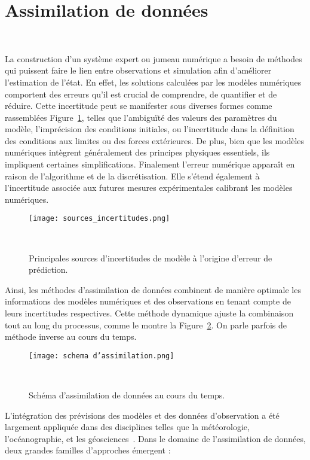 
\section{Assimilation de données}~\label{sec:da}

La construction d'un système expert ou jumeau numérique a besoin de méthodes qui puissent faire le lien entre observations et simulation afin d'améliorer l'estimation de l'état. En effet, les solutions calculées par les modèles numériques comportent des erreurs qu'il est crucial de comprendre, de quantifier et de réduire. Cette incertitude peut se manifester sous diverses formes comme rassemblées Figure~\ref{fig:sources_erreur}, telles que l'ambiguïté des valeurs des paramètres du modèle, l'imprécision des conditions initiales, ou l'incertitude dans la définition des conditions aux limites ou des forces extérieures. De plus, bien que les modèles numériques intègrent généralement des principes physiques essentiels, ils impliquent certaines simplifications. Finalement l'erreur numérique apparaît en raison de l'algorithme et de la discrétisation. Elle s'étend également à l'incertitude associée aux futures mesures expérimentales calibrant les modèles numériques.

\begin{figure}[h]
    \centering
    \texttt{[image: sources\_incertitudes.png]}
    \caption{Principales sources d'incertitudes de modèle à l'origine d'erreur de prédiction.}~\label{fig:sources_erreur}
\end{figure}
Ainsi, les méthodes d'assimilation de données combinent de manière optimale les informations des modèles numériques et des observations en tenant compte de leurs incertitudes respectives. Cette méthode dynamique ajuste la combinaison tout au long du processus, comme le montre la Figure~\ref{fig:assim_da_scheme}. On parle parfois de méthode inverse au cours du temps.
\begin{figure}[h]
    \centering
    \texttt{[image: schema d'assimilation.png]}
    \caption{Schéma d'assimilation de données au cours du temps.}~\label{fig:assim_da_scheme}
\end{figure}
L'intégration des prévisions des modèles et des données d'observation a été largement appliquée dans des disciplines telles que la météorologie, l'océanographie, et les géosciences~\cite{bocquet_introduction_2014}. Dans le domaine de l'assimilation de données, deux grandes familles d'approches émergent :

